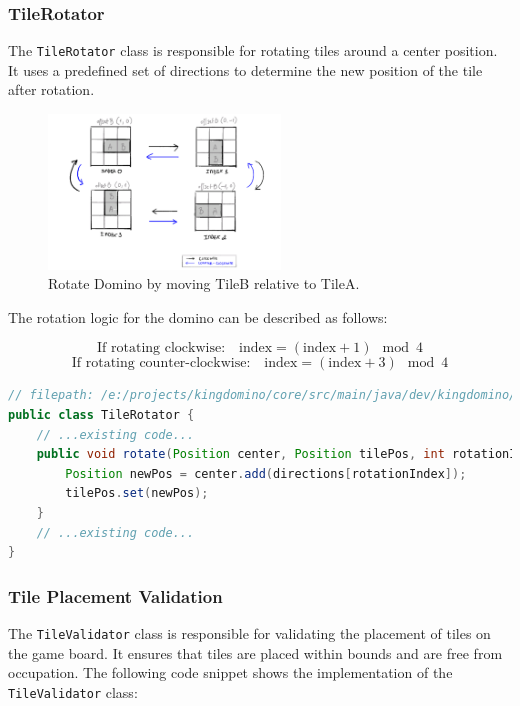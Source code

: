 \documentclass[conference]{IEEEtran}
\begin{document}
\subsubsection{TileRotator}

The \texttt{TileRotator} class is responsible for rotating tiles around a
center position. It uses a predefined set of directions to determine the new
position of the tile after rotation.

\begin{figure}[htbp]
    \centerline{\includegraphics[width=0.55\textwidth]{assets/rotate.png}}
    \caption{Rotate Domino by moving TileB relative to TileA.}\label{fig:rotate}
\end{figure}

The rotation logic for the domino can be described as follows:

\[
    \text{If rotating clockwise:} \quad\boxed{\text{index} = (\text{index} + 1) \mod 4}
\]
\[
    \text{If rotating counter-clockwise:} \quad\boxed{\text{index} = (\text{index} + 3) \mod 4}
\]

\begin{lstlisting}[language=Java]
// filepath: /e:/projects/kingdomino/core/src/main/java/dev/kingdomino/game/TileRotator.java
public class TileRotator {
    // ...existing code...
    public void rotate(Position center, Position tilePos, int rotationIndex, boolean shouldOffset) {
        Position newPos = center.add(directions[rotationIndex]);
        tilePos.set(newPos);
    }
    // ...existing code...
}
\end{lstlisting}

\subsubsection{Tile Placement Validation}

The \texttt{TileValidator} class is responsible for validating the placement of
tiles on the game board. It ensures that tiles are placed within bounds and are
free from occupation. The following code snippet shows the implementation of
the \texttt{TileValidator} class:
\end{document}
